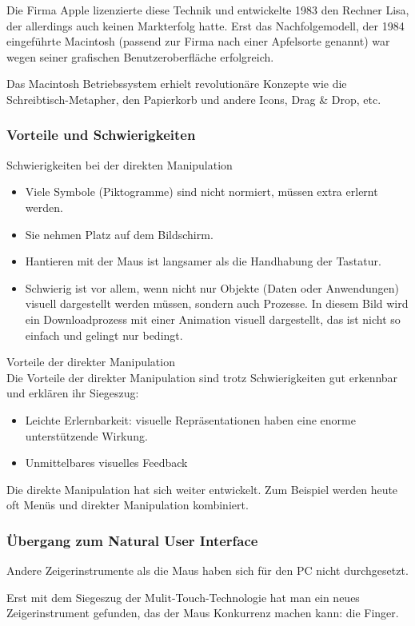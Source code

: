 Die Firma Apple lizenzierte diese Technik und entwickelte 1983 den Rechner Lisa, der allerdings auch keinen Markterfolg hatte. Erst das Nachfolgemodell, der 1984 eingeführte Macintosh (passend zur Firma nach einer Apfelsorte genannt)  war wegen seiner grafischen Benutzeroberfläche erfolgreich.

Das Macintosh Betriebssystem erhielt revolutionäre Konzepte wie die Schreibtisch-Metapher, den Papierkorb und andere Icons, Drag \& Drop, etc.
\subsubsection{Vorteile und Schwierigkeiten}
Schwierigkeiten bei der direkten Manipulation
\begin{itemize}
\item Viele Symbole (Piktogramme) sind nicht normiert, müssen extra erlernt werden.
\item Sie nehmen Platz auf dem Bildschirm.
\item Hantieren mit der Maus ist langsamer als die Handhabung der Tastatur.
\item Schwierig ist vor allem, wenn nicht nur Objekte (Daten oder Anwendungen) visuell dargestellt werden müssen, sondern auch Prozesse. In diesem Bild wird ein Downloadprozess mit einer Animation visuell dargestellt, das ist nicht so einfach und gelingt nur bedingt.
\end{itemize}
Vorteile der direkter Manipulation\\
Die Vorteile der direkter Manipulation sind trotz Schwierigkeiten gut erkennbar und erklären ihr Siegeszug:
\begin{itemize}
\item Leichte Erlernbarkeit: visuelle Repräsentationen haben eine enorme unterstützende Wirkung. 
\item Unmittelbares visuelles Feedback
\end{itemize}
Die direkte Manipulation hat sich weiter entwickelt. Zum Beispiel werden heute oft Menüs und direkter Manipulation kombiniert. 
\subsubsection{Übergang zum Natural User Interface}
Andere Zeigerinstrumente als die Maus haben sich für den PC nicht durchgesetzt.

Erst mit dem Siegeszug der Mulit-Touch-Technologie hat man ein neues Zeigerinstrument gefunden, das der Maus Konkurrenz machen kann: die Finger.

